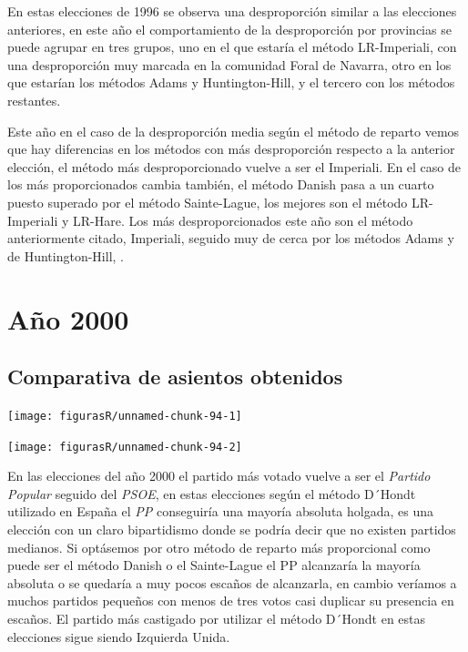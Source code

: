\documentclass[12pt,a4paper,]{book}
\numberwithin{dummy}{section}
\theoremstyle{ocrenumbox}
\theoremstyle{blacknumex}
\theoremstyle{blacknumbox}
\theoremstyle{ocrenum}
\theoremstyle{ocrenum}
\begin{document}
En estas elecciones de 1996 se observa una desproporción similar a las
elecciones anteriores, en este año el comportamiento de la desproporción
por provincias se puede agrupar en tres grupos, uno en el que estaría el
método LR-Imperiali, con una desproporción muy marcada en la comunidad
Foral de Navarra, otro en los que estarían los métodos Adams y
Huntington-Hill, y el tercero con los métodos restantes.

Este año en el caso de la desproporción media según el método de reparto
vemos que hay diferencias en los métodos con más desproporción respecto
a la anterior elección, el método más desproporcionado vuelve a ser el
Imperiali. En el caso de los más proporcionados cambia también, el
método Danish pasa a un cuarto puesto superado por el método
Sainte-Lague, los mejores son el método LR-Imperiali y LR-Hare. Los más
desproporcionados este año son el método anteriormente citado,
Imperiali, seguido muy de cerca por los métodos Adams y de
Huntington-Hill, .

\hypertarget{auxf1o-2000}{%
\section{Año 2000}\label{auxf1o-2000}}

\hypertarget{comparativa-de-asientos-obtenidos-7}{%
\subsection{Comparativa de asientos
obtenidos}\label{comparativa-de-asientos-obtenidos-7}}

\begin{center}\texttt{[image: figurasR/unnamed-chunk-94-1]} \end{center}

\begin{center}\texttt{[image: figurasR/unnamed-chunk-94-2]} \end{center}

En las elecciones del año 2000 el partido más votado vuelve a ser el
\emph{Partido Popular} seguido del \emph{PSOE}, en estas elecciones
según el método D´Hondt utilizado en España el \emph{PP} conseguiría una
mayoría absoluta holgada, es una elección con un claro bipartidismo
donde se podría decir que no existen partidos medianos. Si optásemos por
otro método de reparto más proporcional como puede ser el método Danish
o el Sainte-Lague el PP alcanzaría la mayoría absoluta o se quedaría a
muy pocos escaños de alcanzarla, en cambio veríamos a muchos partidos
pequeños con menos de tres votos casi duplicar su presencia en escaños.
El partido más castigado por utilizar el método D´Hondt en estas
elecciones sigue siendo Izquierda Unida.
\end{document}
